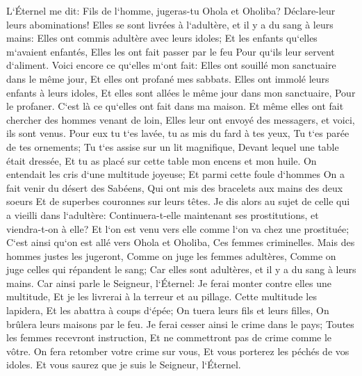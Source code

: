 \verse L`Éternel me dit: Fils de l`homme, jugeras-tu Ohola et Oholiba? Déclare-leur leurs abominations! 
\verse Elles se sont livrées à l`adultère, et il y a du sang à leurs mains: Elles ont commis adultère avec leurs idoles; Et les enfants qu`elles m`avaient enfantés, Elles les ont fait passer par le feu Pour qu`ils leur servent d`aliment. 
\verse Voici encore ce qu`elles m`ont fait: Elles ont souillé mon sanctuaire dans le même jour, Et elles ont profané mes sabbats. 
\verse Elles ont immolé leurs enfants à leurs idoles, Et elles sont allées le même jour dans mon sanctuaire, Pour le profaner. C`est là ce qu`elles ont fait dans ma maison. 
\verse Et même elles ont fait chercher des hommes venant de loin, Elles leur ont envoyé des messagers, et voici, ils sont venus. Pour eux tu t`es lavée, tu as mis du fard à tes yeux, Tu t`es parée de tes ornements; 
\verse Tu t`es assise sur un lit magnifique, Devant lequel une table était dressée, Et tu as placé sur cette table mon encens et mon huile. 
\verse On entendait les cris d`une multitude joyeuse; Et parmi cette foule d`hommes On a fait venir du désert des Sabéens, Qui ont mis des bracelets aux mains des deux soeurs Et de superbes couronnes sur leurs têtes. 
\verse Je dis alors au sujet de celle qui a vieilli dans l`adultère: Continuera-t-elle maintenant ses prostitutions, et viendra-t-on à elle? 
\verse Et l`on est venu vers elle comme l`on va chez une prostituée; C`est ainsi qu`on est allé vers Ohola et Oholiba, Ces femmes criminelles. 
\verse Mais des hommes justes les jugeront, Comme on juge les femmes adultères, Comme on juge celles qui répandent le sang; Car elles sont adultères, et il y a du sang à leurs mains. 
\verse Car ainsi parle le Seigneur, l`Éternel: Je ferai monter contre elles une multitude, Et je les livrerai à la terreur et au pillage. 
\verse Cette multitude les lapidera, Et les abattra à coups d`épée; On tuera leurs fils et leurs filles, On brûlera leurs maisons par le feu. 
\verse Je ferai cesser ainsi le crime dans le pays; Toutes les femmes recevront instruction, Et ne commettront pas de crime comme le vôtre. 
\verse On fera retomber votre crime sur vous, Et vous porterez les péchés de vos idoles. Et vous saurez que je suis le Seigneur, l`Éternel. 

\chapter{}

